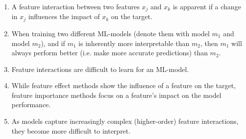 \begin{enumerate}
    \item A feature interaction between two features $x_j$ and $x_k$ is apparent if a change in $x_j$ influences the impact of $x_k$ on the target.
        
    \item When training two different ML-models (denote them with model \(m_1\) and model $m_2$), and if $m_1$ is inherently more interpretable than \(m_2\), then $m_1$ will always perform better (i.e. make more accurate predictions) than $m_2$.


    \item Feature interactions are difficult to learn for an ML-model.
    
    
    \item While feature effect methods show the influence of a feature on the target, feature importance methods focus on a feature's impact on the model performance.
    
    \item As models capture increasingly complex (higher-order) feature interactions, they become more difficult to interpret.

\end{enumerate}